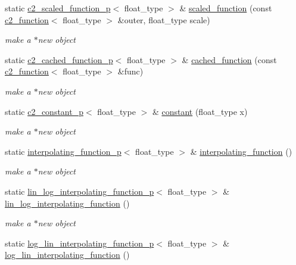 \begin{DoxyCompactItemize}
static \hyperlink{classc2__scaled__function__p}{c2\+\_\+scaled\+\_\+function\+\_\+p}$<$ float\+\_\+type $>$ \& \hyperlink{classc2__factory_a81a7b686b7ffa389ad4dcd8d18997332}{scaled\+\_\+function} (const \hyperlink{classc2__function}{c2\+\_\+function}$<$ float\+\_\+type $>$ \&outer, float\+\_\+type scale)
\begin{DoxyCompactList}\small\item\em make a $\ast$new object \end{DoxyCompactList}\item 
static \hyperlink{classc2__cached__function__p}{c2\+\_\+cached\+\_\+function\+\_\+p}$<$ float\+\_\+type $>$ \& \hyperlink{classc2__factory_aff889f94ad411d97f2e47f1c55fd0324}{cached\+\_\+function} (const \hyperlink{classc2__function}{c2\+\_\+function}$<$ float\+\_\+type $>$ \&func)
\begin{DoxyCompactList}\small\item\em make a $\ast$new object \end{DoxyCompactList}\item 
static \hyperlink{classc2__constant__p}{c2\+\_\+constant\+\_\+p}$<$ float\+\_\+type $>$ \& \hyperlink{classc2__factory_a98e385b2b927d15d4376821302061d4d}{constant} (float\+\_\+type x)
\begin{DoxyCompactList}\small\item\em make a $\ast$new object \end{DoxyCompactList}\item 
static \hyperlink{classinterpolating__function__p}{interpolating\+\_\+function\+\_\+p}$<$ float\+\_\+type $>$ \& \hyperlink{classc2__factory_ab43eaad040801a28019b917c4195b8d5}{interpolating\+\_\+function} ()
\begin{DoxyCompactList}\small\item\em make a $\ast$new object \end{DoxyCompactList}\item 
static \hyperlink{classlin__log__interpolating__function__p}{lin\+\_\+log\+\_\+interpolating\+\_\+function\+\_\+p}$<$ float\+\_\+type $>$ \& \hyperlink{classc2__factory_ab3e9ddf591f0cb2d327dc02c41836232}{lin\+\_\+log\+\_\+interpolating\+\_\+function} ()
\begin{DoxyCompactList}\small\item\em make a $\ast$new object \end{DoxyCompactList}\item 
static \hyperlink{classlog__lin__interpolating__function__p}{log\+\_\+lin\+\_\+interpolating\+\_\+function\+\_\+p}$<$ float\+\_\+type $>$ \& \hyperlink{classc2__factory_afecb73857f9c060b6e32be187705b573}{log\+\_\+lin\+\_\+interpolating\+\_\+function} ()

\end{DoxyCompactItemize}
